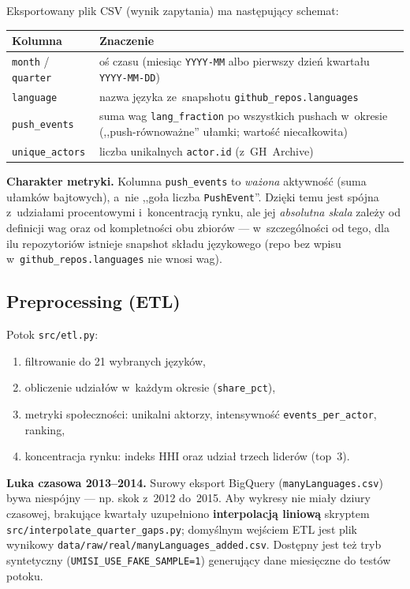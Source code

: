 \documentclass[11pt,a4paper]{article}
\begin{document}
Eksportowany plik CSV (wynik zapytania) ma następujący schemat:

\begin{center}
\begin{tabular}{@{}lp{11cm}@{}}
\toprule
\textbf{Kolumna} & \textbf{Znaczenie} \\
\midrule
\texttt{month} / \texttt{quarter} & oś czasu (miesiąc \texttt{YYYY-MM} albo pierwszy dzień kwartału \texttt{YYYY-MM-DD}) \\
\texttt{language} & nazwa języka ze~snapshotu \texttt{github\_repos.languages} \\
\texttt{push\_events} & suma wag \texttt{lang\_fraction} po wszystkich pushach w~okresie (,,push-równoważne'' ułamki; wartość niecałkowita) \\
\texttt{unique\_actors} & liczba unikalnych \texttt{actor.id} (z~GH~Archive) \\
\bottomrule
\end{tabular}
\end{center}

\textbf{Charakter metryki.} Kolumna \texttt{push\_events} to \emph{ważona} aktywność
(suma ułamków bajtowych), a~nie ,,goła liczba \texttt{PushEvent}''. Dzięki temu jest spójna
z~udziałami procentowymi i~koncentracją rynku, ale jej \emph{absolutna skala} zależy od definicji
wag oraz od kompletności obu zbiorów --- w~szczególności od tego, dla ilu repozytoriów istnieje
snapshot składu językowego (repo bez wpisu w~\texttt{github\_repos.languages} nie wnosi wag).

\subsection{Preprocessing (ETL)}

Potok \texttt{src/etl.py}:
\begin{enumerate}[nosep]
  \item filtrowanie do 21 wybranych języków,
  \item obliczenie udziałów w~każdym okresie (\texttt{share\_pct}),
  \item metryki społeczności: unikalni aktorzy, intensywność \texttt{events\_per\_actor}, ranking,
  \item koncentracja rynku: indeks HHI oraz udział trzech liderów (top~3).
\end{enumerate}

\textbf{Luka czasowa 2013--2014.} Surowy eksport BigQuery (\texttt{manyLanguages.csv}) bywa
niespójny --- np. skok z~2012 do~2015. Aby wykresy nie miały dziury czasowej, brakujące
kwartały uzupełniono \textbf{interpolacją liniową} skryptem
\texttt{src/interpolate\_quarter\_gaps.py}; domyślnym wejściem ETL jest plik wynikowy
\texttt{data/raw/real/manyLanguages\_added.csv}. Dostępny jest też tryb syntetyczny
(\texttt{UMISI\_USE\_FAKE\_SAMPLE=1}) generujący dane miesięczne do testów potoku.
\end{document}
